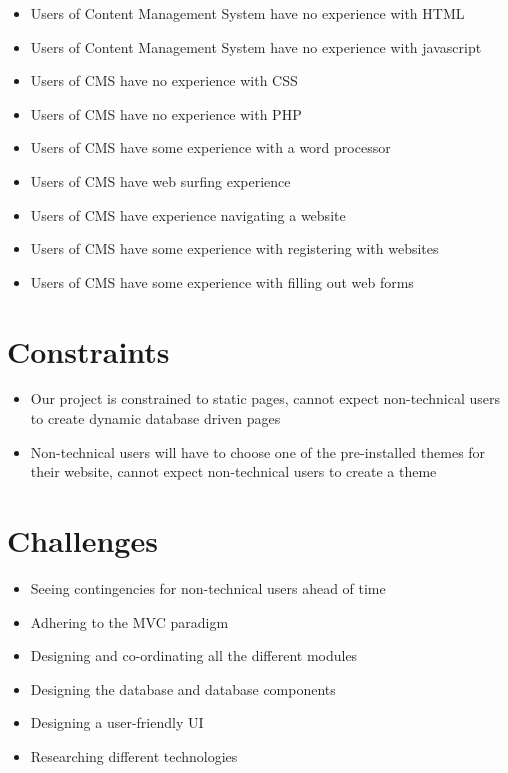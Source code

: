 \documentclass[11pt]{article}
\begin{document}
\begin{itemize}
  \item Users of Content Management System have no experience with HTML
  \item Users of Content Management System have no experience with javascript
  \item Users of CMS have no experience with CSS
  \item Users of CMS have no experience with PHP
  \item Users of CMS have some experience with a word processor
  \item Users of CMS have web surfing experience
  \item Users of CMS have experience navigating a website
  \item Users of CMS have some experience with registering with websites
  \item Users of CMS have some experience with filling out web forms
\end{itemize}


\section{Constraints}
\begin{itemize}
  \item Our project is constrained to static pages, cannot expect non-technical users to create dynamic database driven pages
  \item Non-technical users will have to choose one of the pre-installed themes for their website, cannot expect non-technical users to create a theme
\end{itemize}

\section{Challenges}
\begin{itemize}
  \item Seeing contingencies for non-technical users ahead of time
  \item Adhering to the MVC paradigm
  \item Designing and co-ordinating all the different modules
  \item Designing the database and database components
  \item Designing a user-friendly UI
  \item Researching different technologies
\end{itemize}
\end{document}

